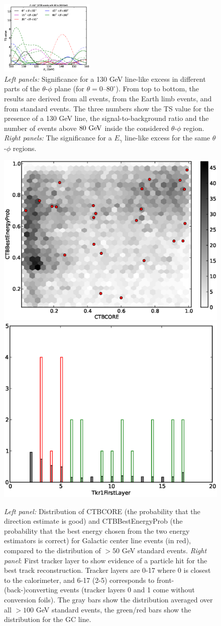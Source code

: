 \documentclass[aps,twocolumn,prd,superscriptaddress,showpacs,nofootinbib,fixfloat]{revtex4}
\newcommand{\GeV}{{\rm ~GeV}}
\begin{document}
\begin{figure}
  \includegraphics[width=0.40\textwidth]{plots/scan_z.LE.100.eps}
  \caption{\emph{Left panels:} Significance for a 130 GeV line-like excess in different parts of
  the $\theta$-$\phi$ plane (for $\theta=0$--$80^\circ$). From top to bottom,
  the results are derived from all events, from the Earth limb events, and
  from standard events. The three numbers
  show the TS value for the presence of a 130 GeV line, the
  signal-to-background ratio and the number of events above $80\GeV$ inside
  the considered $\theta$-$\phi$ region. \emph{Right panels:} The significance
  for a $E_\gamma$ line-like excess for the same $\theta$-$\phi$ regions.}
  \label{fig:polarPlotsAll}
\end{figure}
\begin{figure}
  \centering
  \includegraphics[width=0.48\linewidth]{plots/CTBCORE_CTBBestEnergyProb.eps}
  \includegraphics[width=0.48\linewidth]{plots/Tkr1FirstLayer.eps}
  \caption{\emph{Left panel:} Distribution of CTBCORE (the probability that
  the direction estimate is good) and CTBBestEnergyProb (the probability that
  the best energy chosen from the two energy estimators is correct) for
  Galactic center line events (in red), compared to the distribution of $>50$
  GeV standard events.  \emph{Right panel}: First tracker layer to show
  evidence of a particle hit for the best track reconstruction. Tracker layers
  are 0-17 where 0 is closest to the calorimeter, and 6-17 (2-5) corresponds
  to front- (back-)converting events (tracker layers 0 and 1 come without
  conversion foils). The gray bars show the distribution averaged over all
  $>100$ GeV standard events, the green/red bars show the distribution for the
  GC line.}
  \label{fig:CTBquality}
\end{figure}
\end{document}
